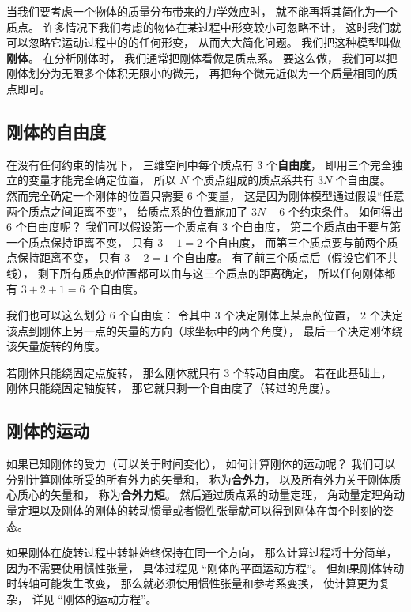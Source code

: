 

当我们要考虑一个物体的质量分布带来的力学效应时， 就不能再将其简化为一个质点。 许多情况下我们考虑的物体在某过程中形变较小可忽略不计， 这时我们就可以忽略它运动过程中的的任何形变， 从而大大简化问题。 我们把这种模型叫做\textbf{刚体}。 在分析刚体时， 我们通常把刚体看做是质点系。 要这么做， 我们可以把刚体划分为无限多个体积无限小的微元， 再把每个微元近似为一个质量相同的质点即可。 

\subsection{刚体的自由度}

在没有任何约束的情况下， 三维空间中每个质点有 3 个\textbf{自由度}， 即用三个完全独立的变量才能完全确定位置， 所以 $N$ 个质点组成的质点系共有 $3N$ 个自由度。 然而完全确定一个刚体的位置只需要 6 个变量， 这是因为刚体模型通过假设“任意两个质点之间距离不变”， 给质点系的位置施加了 $3N - 6$ 个约束条件。 如何得出 6 个自由度呢？ 我们可以假设第一个质点有 3 个自由度， 第二个质点由于要与第一个质点保持距离不变， 只有 $3 - 1 = 2$ 个自由度， 而第三个质点要与前两个质点保持距离不变， 只有 $3 - 2 = 1$ 个自由度。 有了前三个质点后（假设它们不共线）， 剩下所有质点的位置都可以由与这三个质点的距离确定， 所以任何刚体都有 $3 + 2 + 1 = 6$ 个自由度。

我们也可以这么划分 6 个自由度： 令其中 3 个决定刚体上某点的位置， 2 个决定该点到刚体上另一点的矢量的方向（球坐标中的两个角度）， 最后一个决定刚体绕该矢量旋转的角度。

若刚体只能绕固定点旋转， 那么刚体就只有 3 个转动自由度。 若在此基础上， 刚体只能绕固定轴旋转， 那它就只剩一个自由度了（转过的角度）。

\subsection{刚体的运动}
如果已知刚体的受力（可以关于时间变化）， 如何计算刚体的运动呢？ 我们可以分别计算刚体所受的所有外力的矢量和， 称为\textbf{合外力}， 以及所有外力关于刚体质心质心的矢量和， 称为\textbf{合外力矩}。 然后通过质点系的动量定理， 角动量定理角动量定理以及刚体的刚体的转动惯量或者惯性张量就可以得到刚体在每个时刻的姿态。

如果刚体在旋转过程中转轴始终保持在同一个方向， 那么计算过程将十分简单， 因为不需要使用惯性张量， 具体过程见 “刚体的平面运动方程”。 但如果刚体转动时转轴可能发生改变， 那么就必须使用惯性张量和参考系变换， 使计算更为复杂， 详见 “刚体的运动方程”。
